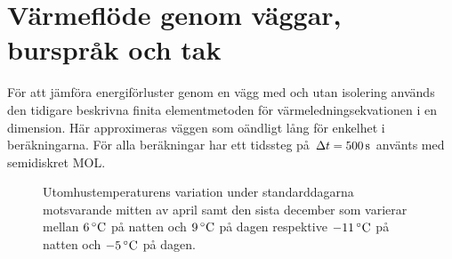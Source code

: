 \section{Värmeflöde genom väggar, burspråk och tak}

För att jämföra energiförluster genom en vägg med och utan isolering används
den tidigare beskrivna finita elementmetoden för värmeledningsekvationen i en dimension. Här approximeras
väggen som oändligt lång för enkelhet i beräkningarna. För alla beräkningar har ett tidssteg
på $\Delta t = \unit[500]{s}$ använts med semidiskret MOL.

\begin{figure}[hpbt]
\centering

\vspace{1cm}

\caption{\label{fig:temperaturedist} Utomhustemperaturens variation under standarddagarna motsvarande mitten av april samt den sista december som varierar mellan $\unit[6]{^\circ C}$ på natten och $\unit[9]{^\circ C}$ på dagen respektive $\unit[-11]{^\circ C}$ på natten och $\unit[-5]{^\circ C}$ på dagen.
}
\end{figure}



